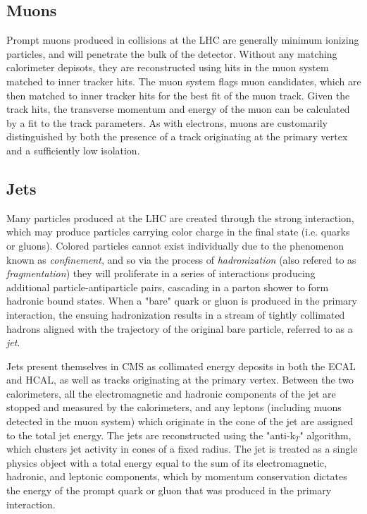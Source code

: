\subsection{Muons}
\label{subsec:muons}
Prompt muons produced in collisions at the LHC are generally minimum ionizing particles, and will penetrate the bulk of the detector. Without any matching calorimeter depisots, they are reconstructed using hits in the muon system matched to inner tracker hits. The muon system flags muon candidates, which are then matched to inner tracker hits for the best fit of the muon track. Given the track hits, the transverse momentum and energy of the muon can be calculated by a fit to the track parameters. As with electrons, muons are customarily distinguished by both the presence of a track originating at the primary vertex and a sufficiently low isolation.

\subsection{Jets}
\label{subsec:jets}
Many particles produced at the LHC are created through the strong interaction, which may produce particles carrying color charge in the final state (i.e. quarks or gluons). Colored particles cannot exist individually due to the phenomenon known as {\it confinement}, and so via the process of {\it hadronization} (also refered to as {\it fragmentation}) they will proliferate in a series of interactions producing additional particle-antiparticle pairs, cascading in a parton shower to form hadronic bound states. When a "bare" quark or gluon is produced in the primary interaction, the ensuing hadronization results in a stream of tightly collimated hadrons aligned with the trajectory of the original bare particle, referred to as a {\it jet}. 

Jets present themselves in CMS as collimated energy deposits in both the ECAL and HCAL, as well as tracks originating at the primary vertex. Between the two calorimeters, all the electromagnetic and hadronic components of the jet are stopped and measured by the calorimeters, and any leptons (including muons detected in the muon system) which originate in the cone of the jet are assigned to the total jet energy. The jets are reconstructed using the "anti-k$_T$" algorithm, which clusters jet activity in cones of a fixed radius. The jet is treated as a single physics object with a total energy equal to the sum of its electromagnetic, hadronic, and leptonic components, which by momentum conservation dictates the energy of the prompt quark or gluon that was produced in the primary interaction. 

